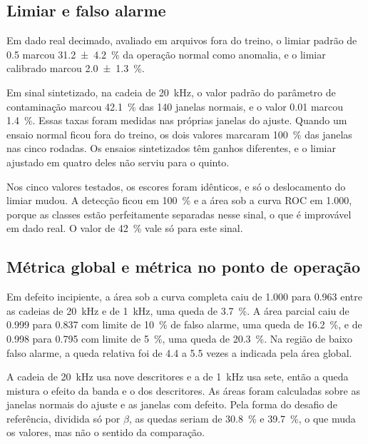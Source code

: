 \subsection{Limiar e falso alarme}

Em dado real decimado, avaliado em arquivos fora do treino, o limiar padrão de \num{0,5} marcou
\SI{31,2 \pm 4,2}{\percent} da operação normal como anomalia, e o limiar calibrado marcou
\SI{2,0 \pm 1,3}{\percent}.

Em sinal sintetizado, na cadeia de \SI{20}{\kilo\hertz}, o valor padrão do parâmetro de
contaminação marcou \SI{42,1}{\percent} das \num{140} janelas normais, e o valor \num{0,01}
marcou \SI{1,4}{\percent}. Essas taxas foram medidas nas próprias janelas do ajuste. Quando um
ensaio normal ficou fora do treino, os dois valores marcaram \SI{100}{\percent} das janelas nas
cinco rodadas. Os ensaios sintetizados têm ganhos diferentes, e o limiar ajustado em quatro deles
não serviu para o quinto.

Nos cinco valores testados, os escores foram idênticos, e só o deslocamento do limiar mudou. A
detecção ficou em \SI{100}{\percent} e a área sob a curva ROC em \num{1,000}, porque as classes
estão perfeitamente separadas nesse sinal, o que é improvável em dado real. O valor de
\SI{42}{\percent} vale só para este sinal.

\subsection{Métrica global e métrica no ponto de operação}

Em defeito incipiente, a área sob a curva completa caiu de \num{1,000} para \num{0,963} entre as
cadeias de \SI{20}{\kilo\hertz} e de \SI{1}{\kilo\hertz}, uma queda de \SI{3,7}{\percent}. A área
parcial caiu de \num{0,999} para \num{0,837} com limite de \SI{10}{\percent} de falso alarme, uma
queda de \SI{16,2}{\percent}, e de \num{0,998} para \num{0,795} com limite de \SI{5}{\percent}, uma
queda de \SI{20,3}{\percent}. Na região de baixo falso alarme, a queda relativa foi de \num{4,4} a
\num{5,5} vezes a indicada pela área global.

A cadeia de \SI{20}{\kilo\hertz} usa nove descritores e a de
\SI{1}{\kilo\hertz} usa sete, então a queda mistura o efeito da banda e o dos descritores. As áreas
foram calculadas sobre as janelas normais do ajuste e as janelas com defeito. Pela forma do desafio
de referência, dividida só por $\beta$, as quedas seriam de \SI{30,8}{\percent} e
\SI{39,7}{\percent}, o que muda os valores, mas não o sentido da comparação.

